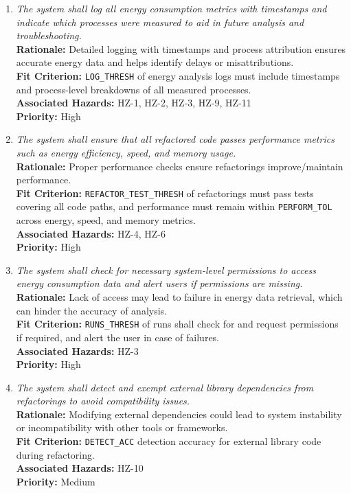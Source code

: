 \documentclass{article}
\begin{document}
\begin{enumerate}[label=SCR \arabic*., wide=0pt, leftmargin=*]

    \item \emph{The system shall log all energy consumption metrics with timestamps and indicate which processes were measured to aid in future analysis and troubleshooting.}\\
    {\bf Rationale:} Detailed logging with timestamps and process attribution ensures accurate energy data and helps identify delays or misattributions.\\
    {\bf Fit Criterion:} \texttt{LOG\_THRESH} of energy analysis logs must include timestamps and process-level breakdowns of all measured processes.\\
    {\bf Associated Hazards:} HZ-1, HZ-2, HZ-3, HZ-9, HZ-11\\
    {\bf Priority:} High

    \item \emph{The system shall ensure that all refactored code passes performance metrics such as energy efficiency, speed, and memory usage.}\\
    {\bf Rationale:} Proper performance checks ensure refactorings improve/maintain performance.\\
    {\bf Fit Criterion:} \texttt{REFACTOR\_TEST\_THRESH} of refactorings must pass tests covering all code paths, and performance must remain within \texttt{PERFORM\_TOL} across energy, speed, and memory metrics.\\
    {\bf Associated Hazards:} HZ-4, HZ-6\\
    {\bf Priority:} High

    \item \emph{The system shall check for necessary system-level permissions to access energy consumption data and alert users if permissions are missing.}\\
    {\bf Rationale:} Lack of access may lead to failure in energy data retrieval, which can hinder the accuracy of analysis.\\
    {\bf Fit Criterion:} \texttt{RUNS\_THRESH} of runs shall check for and request permissions if required, and alert the user in case of failures.\\
    {\bf Associated Hazards:} HZ-3\\
    {\bf Priority:} High

    \item \emph{The system shall detect and exempt external library dependencies from refactorings to avoid compatibility issues.}\\
    {\bf Rationale:} Modifying external dependencies could lead to system instability or incompatibility with other tools or frameworks.\\
    {\bf Fit Criterion:} \texttt{DETECT\_ACC} detection accuracy for external library code during refactoring.\\
    {\bf Associated Hazards:} HZ-10\\
    {\bf Priority:} Medium


\end{enumerate}
\end{document}
